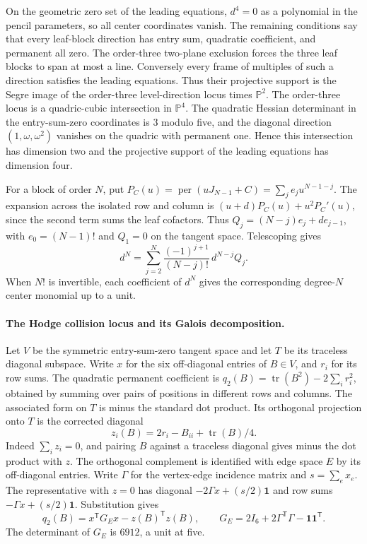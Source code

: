 On the geometric zero set of the leading equations, \(d^4=0\)
as a polynomial in the pencil parameters, so all center coordinates
vanish. The remaining conditions say that every leaf-block direction
has entry sum, quadratic coefficient, and permanent all zero.
The order-three two-plane exclusion forces the three leaf blocks to
span at most a line. Conversely every frame of multiples of such a
direction satisfies the leading equations. Thus their projective
support is the Segre image of the order-three level-direction locus
times \(\mathbb P^2\). The order-three locus is a quadric-cubic
intersection in \(\mathbb P^4\). The quadratic Hessian determinant
in the entry-sum-zero coordinates is \(3\) modulo five, and the
diagonal direction \((1,\omega,\omega^2)\) vanishes on the quadric
with permanent one. Hence this intersection has dimension two and
the projective support of the leading equations has dimension four.

For a block of order \(N\), put
\(P_C(u)=\operatorname{per}(uJ_{N-1}+C)=\sum_j e_j u^{N-1-j}\).
The expansion across the isolated row and column is
\((u+d)P_C(u)+u^2P_C'(u)\), since the second term sums the leaf
cofactors. Thus \(Q_j=(N-j)e_j+de_{j-1}\), with
\(e_0=(N-1)!\) and \(Q_1=0\) on the tangent space. Telescoping gives
\[
 d^N=\sum_{j=2}^N\frac{(-1)^{j+1}}{(N-j)!}\,d^{N-j}Q_j.
\]
When \(N!\) is invertible, each coefficient of \(d^N\) gives the
corresponding degree-\(N\) center monomial up to a unit.

\paragraph{The Hodge collision locus and its Galois decomposition.}
Let \(V\) be the symmetric entry-sum-zero tangent space and let
\(T\) be its traceless diagonal subspace. Write \(x\) for the six
off-diagonal entries of \(B\in V\), and \(r_i\) for its row sums.
The quadratic permanent coefficient is
\(q_2(B)=\operatorname{tr}(B^2)-2\sum_i r_i^2\), obtained by
summing over pairs of positions in different rows and columns.
The associated form on \(T\) is minus the standard dot product.
Its orthogonal projection onto \(T\) is the corrected diagonal
\[
 z_i(B)=2r_i-B_{ii}+\operatorname{tr}(B)/4.
\]
Indeed \(\sum_i z_i=0\), and pairing \(B\) against a traceless diagonal
gives minus the dot product with \(z\). The orthogonal complement is
identified with edge space \(E\) by its off-diagonal entries. Write
\(\Gamma\) for the vertex-edge incidence matrix and \(s=\sum_e x_e\).
The representative with \(z=0\) has diagonal
\(-2\Gamma x+(s/2)\mathbf 1\) and row sums
\(-\Gamma x+(s/2)\mathbf 1\). Substitution gives
\[
  q_2(B)= x^{\mathsf T}G_E x-z(B)^{\mathsf T}z(B),
  \qquad G_E=2I_6+2\Gamma^{\mathsf T}\Gamma-\mathbf 1\mathbf 1^{\mathsf T}.
\]
The determinant of \(G_E\) is \(6912\), a unit at five.


